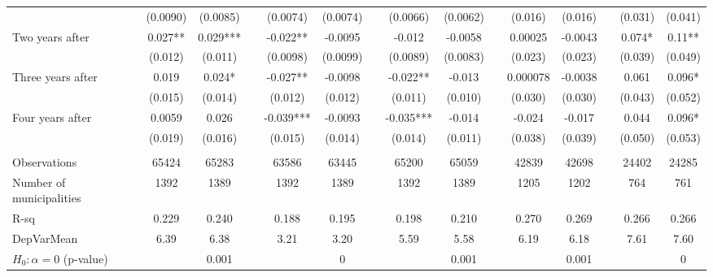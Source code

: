 \begin{tabular}{lcccccccccccccc}
      & (0.0090) & (0.0085) &       & (0.0074) & (0.0074) &       & (0.0066) & (0.0062) &       & (0.016) & (0.016) &       & (0.031) & (0.041) \\
Two years after & 0.027** & 0.029*** &       & -0.022** & -0.0095 &       & -0.012 & -0.0058 &       & 0.00025 & -0.0043 &       & 0.074* & 0.11** \\
      & (0.012) & (0.011) &       & (0.0098) & (0.0099) &       & (0.0089) & (0.0083) &       & (0.023) & (0.023) &       & (0.039) & (0.049) \\
Three years after & 0.019 & 0.024* &       & -0.027** & -0.0098 &       & -0.022** & -0.013 &       & 0.000078 & -0.0038 &       & 0.061 & 0.096* \\
      & (0.015) & (0.014) &       & (0.012) & (0.012) &       & (0.011) & (0.010) &       & (0.030) & (0.030) &       & (0.043) & (0.052) \\
Four years after & 0.0059 & 0.026 &       & -0.039*** & -0.0093 &       & -0.035*** & -0.014 &       & -0.024 & -0.017 &       & 0.044 & 0.096* \\
      & (0.019) & (0.016) &       & (0.015) & (0.014) &       & (0.014) & (0.011) &       & (0.038) & (0.039) &       & (0.050) & (0.053) \\
      &       &       &       &       &       &       &       &       &       &       &       &       &       &  \\
\midrule
Observations & 65424 & 65283 &       & 63586 & 63445 &       & 65200 & 65059 &       & 42839 & 42698 &       & 24402 & 24285 \\
Number of municipalities & 1392  & 1389  &       & 1392  & 1389  &       & 1392  & 1389  &       & 1205  & 1202  &       & 764   & 761 \\
R-sq  & 0.229 & 0.240 &       & 0.188 & 0.195 &       & 0.198 & 0.210 &       & 0.270 & 0.269 &       & 0.266 & 0.266 \\
DepVarMean & 6.39  & 6.38  &       & 3.21  & 3.20  &       & 5.59  & 5.58  &       & 6.19  & 6.18  &       & 7.61  & 7.60 \\
$H_0 : \alpha = 0$ (p-value) &       & 0.001 &       &       & 0     &       &       & 0.001 &       &       & 0.001 &       &       & 0 \\
\bottomrule
\bottomrule
\end{tabular}%
